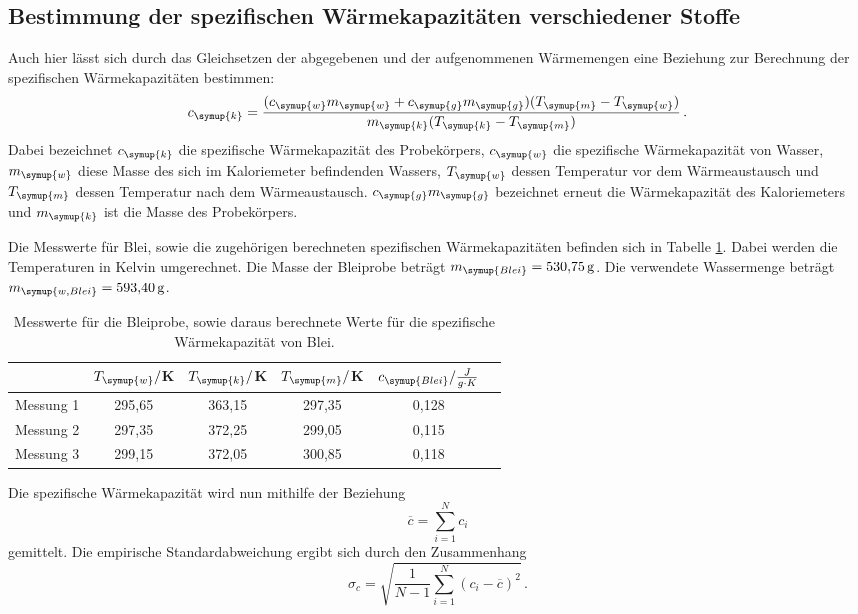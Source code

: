 \subsection{Bestimmung der spezifischen Wärmekapazitäten verschiedener Stoffe}
\label{sec:Auswertung_stoffe}

Auch hier lässt sich durch das Gleichsetzen der abgegebenen und der aufgenommenen
Wärmemengen eine Beziehung zur Berechnung der spezifischen Wärmekapazitäten bestimmen:
\begin{equation}
  c_{\symup{k}}=\frac{(c_{\symup{w}}m_{\symup{w}}+c_{\symup{g}}m_{\symup{g}})
  (T_{\symup{m}}-T_{\symup{w}})}{m_{\symup{k}}(T_{\symup{k}}-T_{\symup{m}})}\,.
\end{equation}
Dabei bezeichnet $c_{\symup{k}}$ die spezifische Wärmekapazität des Probekörpers,
$c_{\symup{w}}$ die spezifische Wärmekapazität von Wasser, $m_{\symup{w}}$ diese
Masse des sich im Kaloriemeter befindenden Wassers, $T_{\symup{w}}$ dessen Temperatur
vor dem Wärmeaustausch und $T_{\symup{m}}$ dessen Temperatur nach dem Wärmeaustausch.
$c_{\symup{g}}m_{\symup{g}}$ bezeichnet erneut die Wärmekapazität des Kaloriemeters
und $m_{\symup{k}}$ ist die Masse des Probekörpers.

Die Messwerte für Blei, sowie die zugehörigen berechneten spezifischen Wärmekapazitäten
befinden sich in Tabelle \ref{tab:blei}. Dabei werden die Temperaturen in Kelvin umgerechnet.
Die Masse der Bleiprobe beträgt $m_{\symup{Blei}}=\SI{530.75}{\gram}$. Die verwendete
Wassermenge beträgt $m_{\symup{w,Blei}}=\SI{593.40}{\gram}$.

\begin{table}
  \centering
  \caption{Messwerte für die Bleiprobe, sowie daraus berechnete Werte für die spezifische
  Wärmekapazität von Blei.}
  \label{tab:blei}
  \begin{tabular}{c c c c c c}
    \toprule
    & $T_{\symup{w}}/$K & $T_{\symup{k}}/$K & $T_{\symup{m}}/$K & $c_{\symup{Blei}}/\frac{J}{g\cdot K}$ \\
    \midrule
    Messung 1 & 295,65 & 363,15 & 297,35 & 0,128 \\
    Messung 2 & 297,35 & 372,25 & 299,05 & 0,115 \\
    Messung 3 & 299,15 & 372,05 & 300,85 & 0,118 \\
    \bottomrule
  \end{tabular}
\end{table}

Die spezifische Wärmekapazität wird nun mithilfe der Beziehung
\begin{equation}
  \overline{c} = \sum\limits_{i = 1}^N c_i
  \label{eqn:mean}
\end{equation}
gemittelt. Die empirische Standardabweichung ergibt sich durch den Zusammenhang
\begin{equation}
  \sigma_c = \sqrt{\frac{1}{N-1}
    \sum\limits_{i = 1}^N
    (c_i-\overline{c})^2} \,.
    \label{eqn:std}
\end{equation}

